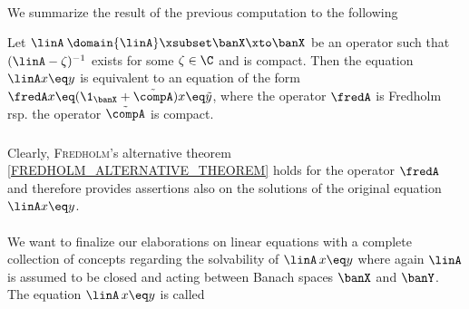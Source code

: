 \documentclass[11pt,twoside]{article}
\begin{document}
\paragraph{}
We summarize the result of the previous computation to the following

\begin{theorem1}\label{FREDHOLM_ALTERNATIVE_THEOREM_II}
Let $\linA \: \domain{\linA} \xsubset \banX \xto \banX$
be an operator such that
$(\linA-\zeta)^{-1}$ exists for some $\zeta \in \C$ and is compact.
Then the equation $\linA x \eq y$ is equivalent to an equation
of the form $\fredA x \eq (\1_{\banX} + \tilde{\compA})x \eq \tilde{y}$,
where
the operator $\fredA$ is Fredholm rsp. the operator $\tilde{\compA}$ is compact.
\end{theorem1}

\subparagraph{}
Clearly,
\textsc{Fredholm}'s alternative theorem \ref{FREDHOLM_ALTERNATIVE_THEOREM}
holds for the operator $\fredA$ and therefore provides assertions
also on the solutions of the original equation $\linA x \eq y$.

\paragraph{} %
We want to finalize our elaborations on linear equations
with a complete collection of concepts
regarding the solvability of $\linA \, x \eq y$
where again $\linA$ is assumed to be closed and
acting between Banach spaces $\banX$ and $\banY$.
The equation $\linA \, x \eq y$ is called
\end{document}
